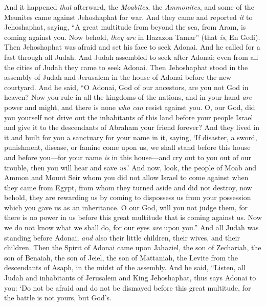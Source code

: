 \begin{biblechapter} %
 And it happened \textit{that} afterward, the \textit{Moabites}, the \textit{Ammonites}, and some of the Meunites came against Jehoshaphat for war.
\verse And they came and reported \textit{it} to Jehoshaphat, saying, “A great multitude from beyond the sea, from Aram, is coming against you. Now behold, \textit{they are} in Hazazon Tamar” (that \textit{is}, En Gedi).
\verse Then Jehoshaphat was afraid and set his face to seek Adonai. And he called for a fast through all Judah.
\verse And Judah assembled to seek after Adonai; even from all the cities of Judah they came to seek Adonai.
\verse Then Jehoshaphat stood in the assembly of Judah and Jerusalem in the house of Adonai before the new courtyard.
\verse And he said, “O Adonai, God of our ancestors, are you not God in heaven? Now you rule in all the kingdoms of the nations, and in your hand \textit{are} power and might, and there is none \textit{who can} resist against you.
\verse O, our God, did you yourself not drive out the inhabitants of this land before your people Israel and give it to the descendants of Abraham your friend forever?
\verse And they lived in it and built for you a sanctuary for your name in it, saying,
\verse ‘If disaster, a sword, punishment, disease, or famine come upon us, we shall stand before this house and before you—for your name \textit{is} in this house—and cry out to you out of our trouble, then you will hear and save \textit{us}.’
\verse And now, look, the people of Moab and Ammon and Mount Seir whom you did not allow Israel to come against when they came from Egypt, from whom they turned aside and did not destroy,
\verse now behold, they are rewarding us by coming to dispossess us from your possession which you gave us as an inheritance.
\verse O our God, will you not judge them, for there is no power in us before this great multitude that is coming against us. Now we do not know what we shall do, for our eyes \textit{are} upon you.”
\verse And all Judah was standing before Adonai, \textit{and} also their little children, their wives, and their children.
\verse Then the Spirit of Adonai came upon Jahaziel, the son of Zechariah, the son of Benaiah, the son of Jeiel, the son of Mattaniah, the Levite from the descendants of Asaph, in the midst of the assembly.
\verse And he said, “Listen, all Judah and inhabitants of Jerusalem and King Jehoshaphat, thus says Adonai to you: ‘Do not be afraid and do not be dismayed before this great multitude, for the battle is not yours, but God’s.

\end{biblechapter}
